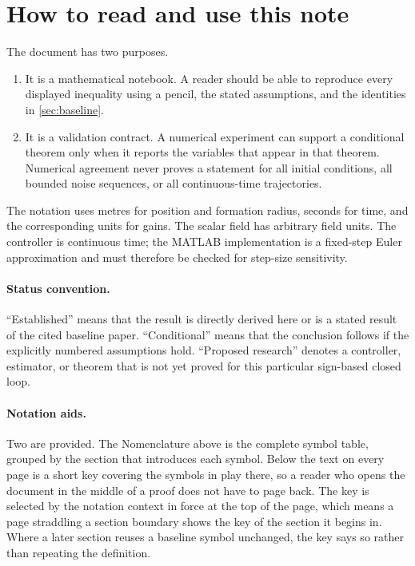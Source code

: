 \documentclass[11pt]{article}
\newcommand{\NotationContext}[1]{\markboth{#1}{#1}}
\begin{document}
\section{How to read and use this note}
\NotationContext{status}

The document has two purposes.
\begin{enumerate}
    \item It is a mathematical notebook. A reader should be able to reproduce every displayed inequality using a pencil, the stated assumptions, and the identities in \cref{sec:baseline}.
    \item It is a validation contract. A numerical experiment can support a conditional theorem only when it reports the variables that appear in that theorem. Numerical agreement never proves a statement for all initial conditions, all bounded noise sequences, or all continuous-time trajectories.
\end{enumerate}

The notation uses metres for position and formation radius, seconds for time, and the corresponding units for gains. The scalar field has arbitrary field units. The controller is continuous time; the MATLAB implementation is a fixed-step Euler approximation and must therefore be checked for step-size sensitivity.

\paragraph{Status convention.}
``Established'' means that the result is directly derived here or is a stated result of the cited baseline paper. ``Conditional'' means that the conclusion follows if the explicitly numbered assumptions hold. ``Proposed research'' denotes a controller, estimator, or theorem that is not yet proved for this particular sign-based closed loop.

\paragraph{Notation aids.}
Two are provided. The Nomenclature above is the complete symbol table, grouped by the section that introduces each symbol. Below the text on every page is a short key covering the symbols in play there, so a reader who opens the document in the middle of a proof does not have to page back. The key is selected by the notation context in force at the top of the page, which means a page straddling a section boundary shows the key of the section it begins in. Where a later section reuses a baseline symbol unchanged, the key says so rather than repeating the definition.
\end{document}
